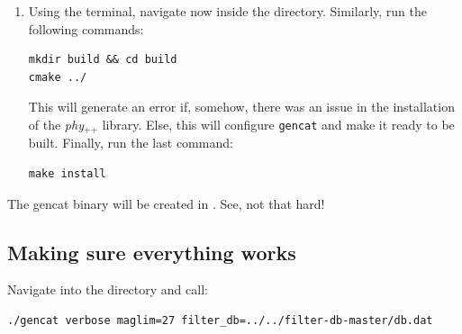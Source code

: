 \documentclass[12pt,a4paper]{article}
\newcommand{\phypp}{\textit{phy}$_{\text{++}}$\xspace}
\begin{document}
\begin{enumerate}
If all goes well, this will configure the \phypp library and prepare it for installation. The script will most likely warn you about missing dependencies, but this is ok since none of these are needed for \texttt{gencat}. Just make sure that cfitsio and WCSlib are found correctly, then install the library with the following command:

\begin{verbatim}
sudo make install
source ~/.phypprc
\end{verbatim}

\item Using the terminal, navigate now inside the  directory. Similarly, run the following commands:
\begin{verbatim}
mkdir build && cd build
cmake ../
\end{verbatim}

This will generate an error if, somehow, there was an issue in the installation of the \phypp library. Else, this will configure \texttt{gencat} and make it ready to be built. Finally, run the last command:
\begin{verbatim}
make install
\end{verbatim}
\end{enumerate}

The gencat binary will be created in . See, not that hard!

\subsection{Making sure everything works}

Navigate into the  directory and call:
\begin{verbatim}
./gencat verbose maglim=27 filter_db=../../filter-db-master/db.dat
\end{verbatim}
\end{document}
